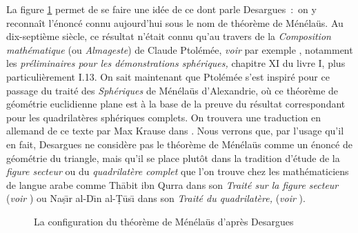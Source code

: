 \documentclass[12pt, a4paper]{article}
\begin{document}
La figure \ref{Menelaus} permet de se faire une idée de ce dont parle Desargues~:~on y reconnaît l'énoncé connu aujourd'hui sous le nom de théorème de Ménélaüs. Au dix-septième siècle, ce résultat n'était connu qu'au travers de  la \textit{Composition mathématique} (ou \textit{Almageste}) de Claude Ptolémée, \textit{voir} par exemple \cite{ptolemee-halma}, notamment les \textit{préliminaires pour les démonstrations sphériques,} chapitre XI du livre I, plus particulièrement I.13. On sait maintenant que Ptolémée s'est inspiré pour ce passage du traité des \textit{Sphériques} de Ménélaüs d'Alexandrie, où ce théorème de géométrie euclidienne plane est à la base de la preuve du résultat correspondant pour les quadrilatères sphériques complets. On trouvera une traduction en allemand de ce texte par Max Krause dans \cite{Menelaus-krause}. Nous verrons que, par  l'usage qu'il en fait, Desargues ne considère pas le théorème de Ménélaüs comme un énoncé de géométrie du triangle, mais qu'il se place plutôt dans la tradition d'étude de la \textit{figure secteur} ou du \textit{quadrilatère complet} que l'on trouve chez les mathématiciens de langue arabe comme Th\={a}bit ibn Qurra dans son \textit{Traité sur la figure secteur} ({\it voir} \cite{qurra-rashed}) ou Na\d{s}\={\i}r al-D\={\i}n al-\d{T}\={u}s\={\i} dans son \textit{Traité du quadrilatère,} ({\it voir} \cite{tusi}).

\begin{figure}[!ht]
\centering
{}
\caption{La configuration du théorème de Ménélaüs d'après Desargues}\label{Menelaus}
\end{figure}
\end{document}
